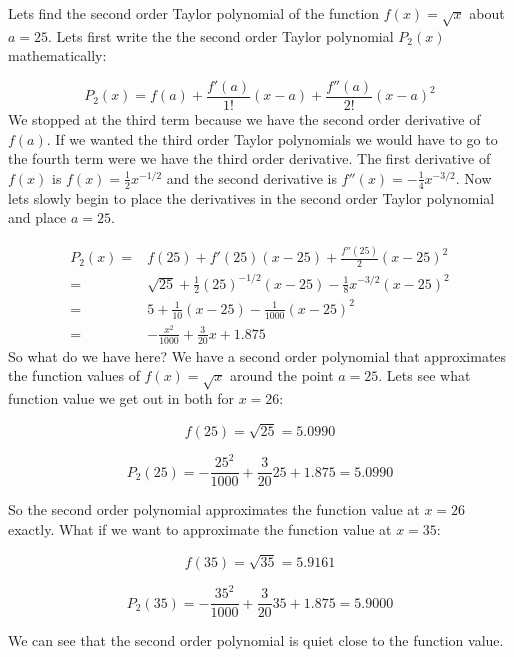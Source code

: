 \documentclass[main.tex]{subfiles}
\begin{document}
\begin{example}
Lets find the second order Taylor polynomial of the function $f(x) = \sqrt{x}$ about $a=25$. Lets first write the the second order Taylor polynomial $P_2(x)$ mathematically:

\begin{equation}
P_2(x) = f(a) + \frac{f'(a)}{1!}(x-a) + \frac{f''(a)}{2!}(x-a)^2
\end{equation}
We stopped at the third term because we have the second order derivative of $f(a)$. If we wanted the third order Taylor polynomials we would have to go to the fourth term were we have the third order derivative. The first derivative of $f(x)$ is $f(x)=\frac{1}{2}x^{-1/2}$ and the second derivative is $f''(x) = -\frac{1}{4}x^{-3/2}$. Now lets slowly begin to place the derivatives in the second order Taylor polynomial and place $a=25$.

\begin{align}
P_2(x) =& f(25) +f'(25)(x-25) + \frac{f''(25)}{2}(x-25)^2\\
=& \sqrt{25} + \frac{1}{2}(25)^{-1/2}(x-25) -\frac{1}{8}x^{-3/2}(x-25)^2 \\
=& 5 + \frac{1}{10}(x-25) - \frac{1}{1000}(x-25)^2 \\
=& -\frac{x^2}{1000} + \frac{3}{20}x + 1.875
\end{align}  
So what do we have here? We have a second order polynomial that approximates the function values of $f(x)=\sqrt{x}$ around the point $a=25$. Lets see what function value we get out in both for $x = 26$:

\begin{equation}
f(25) = \sqrt{25} = 5.0990
\end{equation}

\begin{equation}
P_2(25) = -\frac{25^2}{1000} + \frac{3}{20}25 + 1.875 = 5.0990
\end{equation}

So the second order polynomial approximates the function value at $x = 26$ exactly. What if we want to approximate the function value at $x=35$:

\begin{equation}
f(35) = \sqrt{35} = 5.9161
\end{equation}

\begin{equation}
P_2(35) = -\frac{35^2}{1000} + \frac{3}{20}35 + 1.875 = 5.9000
\end{equation}

We can see that the second order polynomial is quiet close to the function value. 
 
\end{example}
\end{document}
